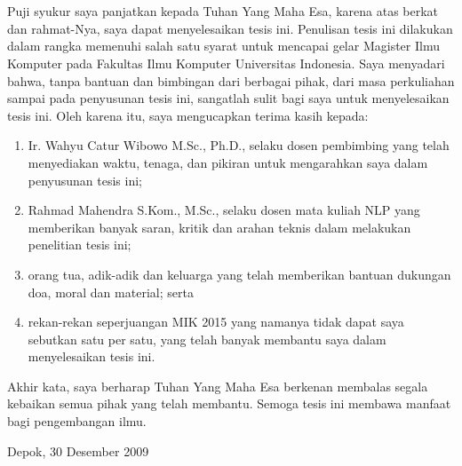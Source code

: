 \chapter*{\kataPengantar}

Puji syukur saya panjatkan kepada Tuhan Yang Maha Esa, karena atas berkat dan rahmat-Nya, saya dapat menyelesaikan tesis ini. Penulisan tesis ini dilakukan dalam rangka memenuhi salah satu syarat untuk mencapai gelar Magister Ilmu Komputer pada Fakultas Ilmu Komputer Universitas Indonesia. Saya menyadari bahwa, tanpa bantuan dan bimbingan dari berbagai pihak, dari masa perkuliahan sampai pada penyusunan tesis ini, sangatlah sulit bagi saya untuk menyelesaikan tesis ini. Oleh karena itu, saya mengucapkan terima kasih kepada:

\begin{enumerate}
	\item Ir. Wahyu Catur Wibowo M.Sc., Ph.D., selaku dosen pembimbing yang telah menyediakan waktu, tenaga, dan pikiran untuk mengarahkan saya dalam penyusunan tesis ini;
	\item Rahmad Mahendra S.Kom., M.Sc., selaku dosen mata kuliah NLP yang memberikan banyak saran, kritik dan arahan teknis dalam melakukan penelitian tesis ini;
	\item orang tua, adik-adik dan keluarga yang telah memberikan bantuan dukungan doa, moral dan material; serta
	\item rekan-rekan seperjuangan MIK 2015 yang namanya tidak dapat saya sebutkan satu per satu, yang telah banyak membantu saya dalam menyelesaikan tesis ini.
\end{enumerate}

Akhir kata, saya berharap Tuhan Yang Maha Esa berkenan membalas segala kebaikan semua pihak yang telah membantu. Semoga tesis ini membawa manfaat bagi pengembangan ilmu.

\vspace*{0.1cm}
\begin{flushright}
Depok, 30 Desember 2009\\[0.1cm]
\vspace*{1cm}
\penulis

\end{flushright}